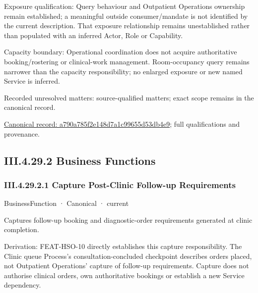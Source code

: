 Exposure qualification: Query behaviour and Outpatient Operations ownership remain established; a meaningful outside consumer/mandate is not identified by the current description. That exposure relationship remains unestablished rather than populated with an inferred Actor, Role or Capability.



Capacity boundary: Operational coordination does not acquire authoritative booking/rostering or clinical-work management. Room-occupancy query remains narrower than the capacity responsibility; no enlarged exposure or new named Service is inferred.


{\small Recorded unresolved matters: source-qualified matters; exact scope remains in the canonical record.}\par
{\footnotesize \href{../../../../continuum/business/business-service/a790a785f2e148d7a1c99655d53db4e9.md}{Canonical record: a790a785f2e148d7a1c99655d53db4e9}; full qualifications and provenance.}\par
\subsection*{III.4.29.2 Business Functions}
\label{navigation:III.4.29.2}

\subsubsection*{III.4.29.2.1 Capture Post-Clinic Follow-up Requirements}
\label{navigation:III.4.29.2.1}

\label{element:9136f75069bf4770bcc8dc395204d475}
{\small BusinessFunction · Canonical · current}\par

Captures follow-up booking and diagnostic-order requirements generated at clinic completion.



Derivation: FEAT-HSO-10 directly establishes this capture responsibility. The Clinic queue Process's consultation-concluded checkpoint describes orders placed, not Outpatient Operations' capture of follow-up requirements. Capture does not authorise clinical orders, own authoritative bookings or establish a new Service dependency.


